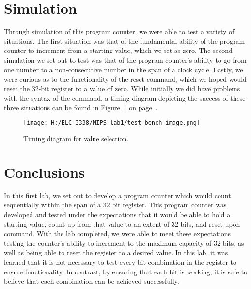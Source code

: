\documentclass{article}
\newcommand{\Verilog}[3]{
  \lstset{language=Verilog}
  \lstset{backgroundcolor=\color{listinggray},rulecolor=\color{blue}}
  \lstset{linewidth=\textwidth}
  \lstset{commentstyle=\textit, stringstyle=\upshape,showspaces=false}
  \lstset{frame=tb}
  
}
\begin{document}
\Verilog{Verilog code for testing a register.}{code:regtest}{H:/ELC-3338/MIPS_lab1/MIPS_lab1.srcs/register_test/imports/code/register_test.v}

\section{Simulation}
Through simulation of this program counter, we were able to test a variety of situations. The first situation was that of the fundamental ability of the program counter to increment from a starting value, which we set as zero.
The second simulation we set out to test was that of the program counter's ability to go from one number to a non-consecutive number in the span of a clock cycle.
Lastly, we were curious as to the functionality of the reset command, which we hoped would reset the 32-bit register to a value of zero. While initially we did have problems with the syntax of the command, a timing diagram depicting the success of these three situations can be found in Figure~\ref{fig:regtest} on page~\pageref{fig:regtest}. 



\begin{figure}
	\begin{center}
		\caption{Timing diagram for value selection.}\label{fig:regtest}
		\texttt{[image: H:/ELC-3338/MIPS\_lab1/test\_bench\_image.png]}
	\end{center}
\end{figure}



\section{Conclusions}
In this first lab, we set out to develop a program counter which would count sequentially within the span of a 32 bit register. This program counter was developed and tested under the expectations that it would be able to hold a starting value, count up from that value to an extent of 32 bits, and reset upon command. With the lab completed, we were able to meet these expectations testing the counter's ability to increment to the maximum capacity of 32 bits, as well as being able to reset the register to a desired value. In this lab, it was learned that it is not necessary to test every bit combination in the register to ensure functionality. In contrast, by ensuring that each bit is working, it is safe to believe that each combination can be achieved successfully.
\end{document}
